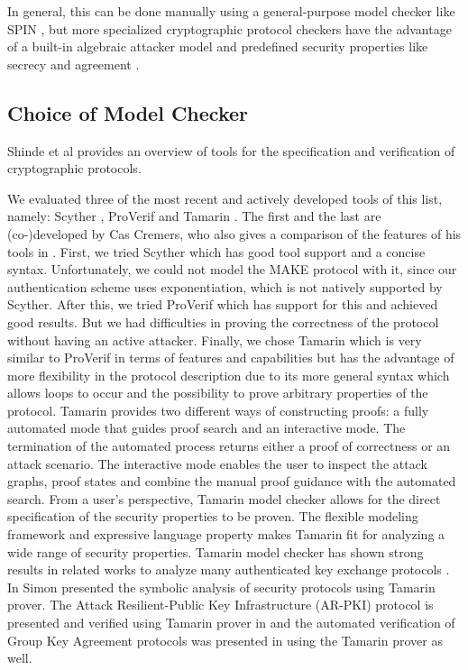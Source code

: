 In general, this can be done manually using a general-purpose model checker like SPIN \cite{maggi2002}, but more specialized cryptographic protocol checkers have the advantage of a built-in algebraic attacker model and predefined security properties like secrecy and agreement \cite{basin2015}.

\subsection{Choice of Model Checker}

Shinde et al \cite{shinde2017} provides an overview of tools for the specification and verification of cryptographic protocols.

We evaluated three of the most recent and actively developed tools of this list, namely: Scyther \cite{cremers2008}, ProVerif \cite{blanchet2001} and Tamarin \cite{schmidt2012}. The first and the last are (co-)developed by Cas Cremers, who also gives a comparison of the features of his tools in \cite{cispa2020}. First, we tried Scyther which has good tool support and a concise syntax. Unfortunately, we could not model the MAKE protocol with it, since our authentication scheme uses exponentiation, which is not natively supported by Scyther. After this, we tried ProVerif which has support for this and achieved good results. But we had difficulties in proving the correctness of the protocol without having an active attacker. Finally, we chose Tamarin which is very similar to ProVerif in terms of features and capabilities but has the advantage of more flexibility in the protocol description due to its more general syntax which allows loops to occur and the possibility to prove arbitrary properties of the protocol. Tamarin provides two different ways of constructing proofs: a fully automated mode that guides proof search and an interactive mode. The termination of the automated process returns either a proof of correctness or an attack scenario. The interactive mode enables the user to inspect the attack graphs, proof states and combine the manual proof guidance with the automated search. From a user's perspective, Tamarin model checker allows for the direct specification of the security properties to be proven. The flexible modeling framework and expressive language property makes Tamarin fit for analyzing a wide range of security properties. Tamarin model checker has shown strong results in related works to analyze many authenticated key exchange protocols \cite{schmidt2012}. In \cite{meier2013} Simon presented the symbolic analysis of security protocols using Tamarin prover. The Attack Resilient-Public Key Infrastructure (AR-PKI) protocol is presented and verified using Tamarin prover in \cite{kim2018} and the automated verification of Group Key Agreement protocols was presented in \cite{basin2014} using the Tamarin prover as well.  
\vspace{0.5em}


